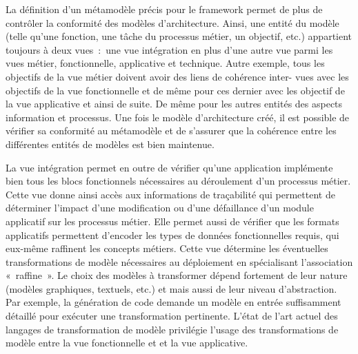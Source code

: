 La définition d'un métamodèle précis pour le framework permet de plus de
contrôler la conformité des modèles d'architecture. Ainsi, une entité du modèle
(telle qu'une fonction, une tâche du processus métier, un objectif, etc.)
appartient toujours à deux vues~:~une vue intégration en plus d'une autre vue
parmi les vues métier, fonctionnelle, applicative et technique. Autre exemple,
tous les objectifs de la vue métier doivent avoir des liens de cohérence inter-
vues avec les objectifs de la vue fonctionnelle et de même pour ces dernier
avec les objectif de la vue applicative et ainsi de suite. De même pour les
autres entités des aspects information et processus. Une fois le modèle
d'architecture créé, il est possible de vérifier sa conformité au métamodèle et
de s'assurer que la cohérence entre les différentes entités de modèles est bien
maintenue.

La vue intégration permet en outre de vérifier qu'une application implémente
bien tous les blocs fonctionnels nécessaires au déroulement d'un processus
métier. Cette vue donne ainsi accès aux informations de traçabilité qui
permettent de déterminer l'impact d'une modification ou d'une défaillance d'un
module applicatif sur les processus métier. Elle permet aussi de vérifier que
les formats applicatifs permettent d'encoder les types de données fonctionnelles
requis, qui eux-même raffinent les concepts métiers. Cette vue détermine les
éventuelles transformations de modèle nécessaires au déploiement en spécialisant
l'association «~raffine~». Le choix des modèles à transformer dépend fortement
de leur nature (modèles graphiques, textuels, etc.) et mais aussi de leur niveau
d'abstraction. Par exemple, la génération de code demande un modèle en entrée
suffisamment détaillé pour exécuter une transformation pertinente. L'état de
l'art actuel des langages de transformation de modèle privilégie l'usage des
transformations de modèle entre la vue fonctionnelle et et la vue applicative.


